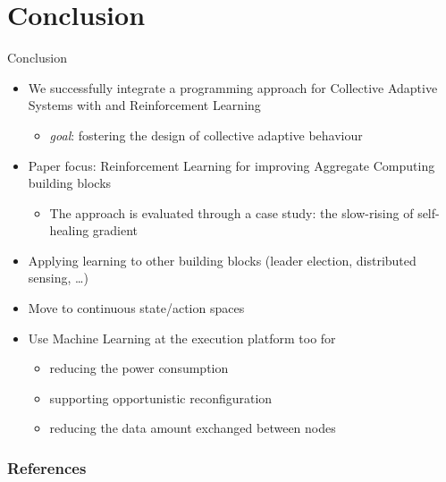 \documentclass[8pt, aspectratio=169, handout]{beamer}
\begin{document}
\section{Conclusion}
\begin{frame}{Conclusion}
  \begin{cardTiny}
  \begin{itemize}
    \item We successfully integrate a programming approach for Collective Adaptive Systems with and Reinforcement Learning
    \begin{itemize}
      \item \emph{goal}:  fostering the design of collective adaptive behaviour
    \end{itemize}
    \item Paper focus: Reinforcement Learning for improving Aggregate Computing building blocks
    \begin{itemize}
      \item The approach is evaluated through a case study: the slow-rising of self-healing gradient 
    \end{itemize}
  \end{itemize}
  \end{cardTiny}
  \begin{card}
    \begin{itemize}
      \item Applying learning to other building blocks (leader election, distributed sensing, \dots)
      \item Move to continuous state/action spaces
      \item Use Machine Learning at the execution platform too for
      \begin{itemize}
        \item reducing the power consumption
        \item supporting opportunistic reconfiguration
        \item reducing the data amount exchanged between nodes
      \end{itemize}
    \end{itemize}
  \end{card}
\end{frame}

\begin{frame}[allowframebreaks]
  \frametitle{References}
  \printbibliography
\end{frame}
\end{document}
